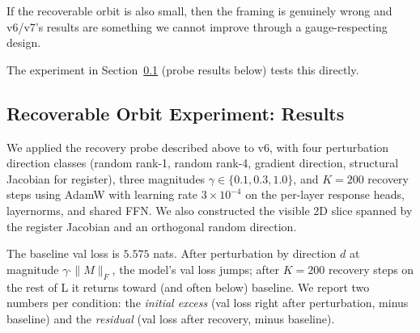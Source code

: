 \documentclass[11pt, a4paper]{article}
\theoremstyle{plain}
\theoremstyle{definition}
\theoremstyle{remark}
\begin{document}
If the recoverable orbit is also small, then the framing is genuinely wrong and v6/v7's results are something we cannot improve through a gauge-respecting design.

The experiment in Section~\ref{sec:recoverable-experiment} (probe results below) tests this directly.

\subsection{Recoverable Orbit Experiment: Results}
\label{sec:recoverable-experiment}

We applied the recovery probe described above to v6, with four perturbation direction classes (random rank-1, random rank-4, gradient direction, structural Jacobian for register), three magnitudes $\gamma \in \{0.1, 0.3, 1.0\}$, and $K = 200$ recovery steps using AdamW with learning rate $3 \times 10^{-4}$ on the per-layer response heads, layernorms, and shared FFN.
We also constructed the visible 2D slice spanned by the register Jacobian and an orthogonal random direction.

The baseline val loss is $5.575$ nats.
After perturbation by direction $d$ at magnitude $\gamma \cdot \|M\|_F$, the model's val loss jumps; after $K = 200$ recovery steps on the rest of L it returns toward (and often below) baseline.
We report two numbers per condition: the \emph{initial excess} (val loss right after perturbation, minus baseline) and the \emph{residual} (val loss after recovery, minus baseline).
\end{document}
